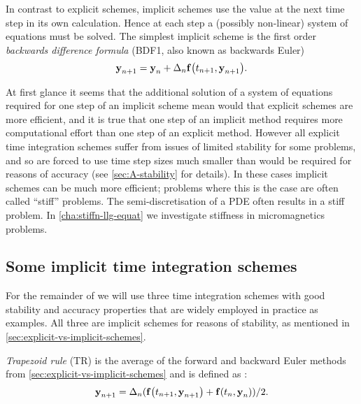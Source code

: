 In contrast to explicit schemes, implicit schemes use the value at the next time step in its own calculation.
Hence at each step a (possibly non-linear) system of equations must be solved.
The simplest implicit scheme is the first order \emph{backwards difference formula} (BDF1, also known as backwards Euler)
\begin{equation}
  \label{eq:bdf1-definition}
  \boldsymbol{\mathrm{y}}_{n+1} = \boldsymbol{\mathrm{y}}_n + \Delta_{n} {\boldsymbol{\mathrm{f}}{\left( t_{n+1}, \boldsymbol{\mathrm{y}}_{n+1} \right)}}.
\end{equation}

At first glance it seems that the additional solution of a system of equations required for one step of an implicit scheme mean would that explicit schemes are more efficient, and it is true that one step of an implicit method requires more computational effort than one step of an explicit method.
However all explicit time integration schemes suffer from issues of limited stability for some problems, and so are forced to use time step sizes much smaller than would be required for reasons of accuracy (see \cref{sec:A-stability} for details).
In these cases implicit schemes can be much more efficient; problems where this is the case are often called ``stiff'' problems.
The semi-discretisation of a PDE often results in a stiff problem.
In \cref{cha:stiffn-llg-equat} we investigate stiffness in micromagnetics problems.




\subsection{Some implicit time integration schemes}
\label{sec:some-implicit-time-integrators}

For the remainder of  we will use three time integration schemes with good stability and accuracy properties that are widely employed in practice as examples.
All three are implicit schemes for reasons of stability, as mentioned in \cref{sec:explicit-vs-implicit-schemes}.

\emph{Trapezoid rule} (TR) is the average of the forward and backward Euler methods from \cref{sec:explicit-vs-implicit-schemes} and is defined as \cite[260]{GreshoSani}:
\begin{equation}
  \boldsymbol{\mathrm{y}}_{n+1} = \Delta_{n} ({\boldsymbol{\mathrm{f}}{\left( t_{n+1}, \boldsymbol{\mathrm{y}}_{n+1} \right)}} + {\boldsymbol{\mathrm{f}}{\left( t_n, \boldsymbol{\mathrm{y}}_n \right)}})/2.
  \label{eq:tr-definition}
\end{equation}

